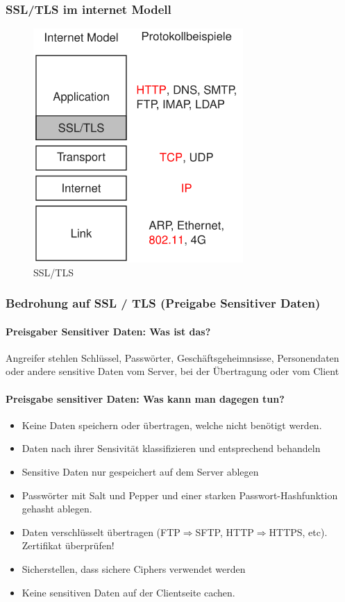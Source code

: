 \documentclass[10pt,a4paper]{article}
\begin{document}
\subsubsection*{SSL/TLS im internet Modell}
\begin{figure}[H]
    \begin{center}
    \includegraphics[width=8cm]{images/SSL-TLS.png}
    \caption{SSL/TLS}
    \label{SSL/TLS}
    \end{center}
\end{figure}

\subsubsection*{Bedrohung auf SSL / TLS (Preigabe Sensitiver Daten)}
\paragraph*{Preisgaber Sensitiver Daten: Was ist das?} Angreifer stehlen Schlüssel, Passwörter, Geschäftsgeheimnsisse,
Personendaten oder andere sensitive Daten vom Server, bei der Übertragung oder vom Client

\paragraph*{Preisgabe sensitiver Daten: Was kann man dagegen tun?}
\begin{itemize}[noitemsep,topsep=0pt,leftmargin=*]
    \item Keine Daten speichern oder übertragen, welche nicht benötigt werden.
    \item Daten nach ihrer Sensivität klassifizieren und entsprechend behandeln
    \item Sensitive Daten nur gespeichert auf dem Server ablegen
    \item Passwörter mit Salt und Pepper und einer starken Passwort-Hashfunktion gehasht ablegen.
    \item Daten verschlüsselt übertragen (FTP$\Rightarrow$SFTP, HTTP$\Rightarrow$HTTPS, etc). Zertifikat überprüfen!
    \item Sicherstellen, dass sichere Ciphers verwendet werden
    \item Keine sensitiven Daten auf der Clientseite cachen.
\end{itemize}
\end{document}
